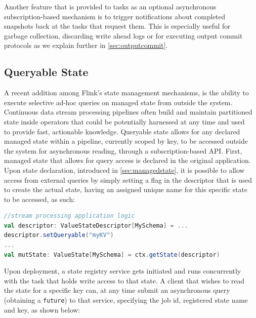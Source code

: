 Another feature that is provided to tasks as an optional asynchronous subscription-based mechanism is to trigger notifications about completed snapshots back at the tasks that request them. This is especially useful for garbage collection, discarding write ahead logs or for executing output commit protocols as we explain further in \autoref{sec:outputcommit}.

\subsection{Queryable State}

A recent addition among Flink's state management mechanisms, is the ability to execute selective ad-hoc queries on managed state from outside the system. Continuous data stream processing pipelines often build and maintain partitioned state inside operators that could be potentially harnessed at any time and used to provide fast, actionable knowledge.
Queryable state allows for any declared managed state within a pipeline, currently scoped by key, to be accessed outside the system for asynchronous reading, through a subscription-based API. First, managed state that allows for query access is declared in the original application. Upon state declaration, introduced in \autoref{sec:managedstate}, it is possible to allow access from external queries by simply setting a flag in the descriptor that is used to create the actual state, having an assigned unique name for this specific state to be accessed, as such:

\begin{lstlisting}[language=scala]
//stream processing application logic
val descriptor: ValueStateDescriptor[MySchema] = ...
descriptor.setQueryable("myKV")
...
val mutState: ValueState[MySchema] = ctx.getState(descriptor)
\end{lstlisting}

\para{} Upon deployment, a state registry service gets initiated and runs concurrently with the task that holds write access to that state. A client that wishes to read the state for a specific key can, at any time submit an asynchronous query (obtaining a \texttt{future}) to that service, specifying the job id, registered state name and key, as shown below:


